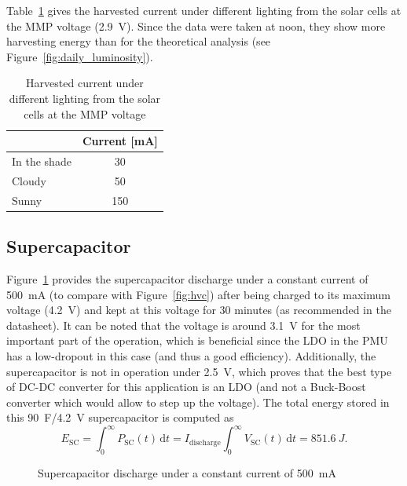 \documentclass{EPL-master-thesis-covers-EN}
\newcommand{\te}[1]{\textrm{#1}}
\begin{document}
Table~\ref{tab:val_current_harvested} gives the harvested current under different lighting from the solar cells at the MMP voltage (\SI{2.9}{V}). Since the data were taken at noon, they show more harvesting energy than for the theoretical analysis (see Figure~\ref{fig:daily_luminosity}).

\begin{table}[H]
\centering
\begin{tabular}{lc}
\hline
                     & Current [\si{mA}]  \\ \hline
 In the shade        & 30                       \\
 Cloudy              & 50                       \\
 Sunny               & 150                      \\ \hline
\end{tabular}
\caption{Harvested current under different lighting from the solar cells at the MMP voltage}
\label{tab:val_current_harvested}
\end{table}

\subsection*{Supercapacitor}

Figure~\ref{fig:discharge_supercap_exp} provides the supercapacitor discharge under a constant current of \SI{500}{mA} (to compare with Figure~\ref{fig:hvc}) after being charged to its maximum voltage (\SI{4.2}{V}) and kept at this voltage for 30 minutes (as recommended in the datasheet). It can be noted that the voltage is around \SI{3.1}{V} for the most important part of the operation, which is beneficial since the LDO in the PMU has a low-dropout in this case (and thus a good efficiency). Additionally, the supercapacitor is not in operation under \SI{2.5}{V}, which proves that the best type of DC-DC converter for this application is an LDO (and not a Buck-Boost converter which would allow to step up the voltage). The total energy stored in this \SI{90}{F}/\SI{4.2}{V} supercapacitor is computed as
\[
 E_\te{SC} = \int_0^\infty P_\te{SC}(t) \, \te{d} t = I_\te{discharge} \int_0^\infty V_\te{SC}(t) \, \te{d} t = \SI{851.6}{J}.
\]

\begin{figure}[H]
    \centering
    
    \caption{Supercapacitor discharge under a constant current of \SI{500}{mA}}
    \label{fig:discharge_supercap_exp}
\end{figure}
\end{document}
